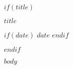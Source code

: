 \documentclass[11pt,letterpaper]{article}
\begin{document}
$if(title)$
\begin{center}
\LARGE{\textbf{$title$}}

$if(date)$
\vspace{0.5cm}
\large{$date$}
$endif$
\end{center}
$endif$

$body$
\end{document}
